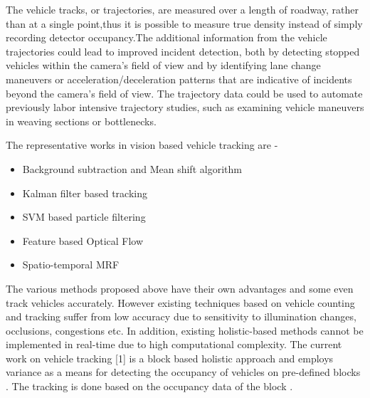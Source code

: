 \documentclass[a4paper,12pt]{article}
\begin{document}
\begin{flushleft}
\vspace{0.1in}
The vehicle tracks, or trajectories, are measured over a length of roadway, rather than at a single point,thus it is possible to measure true density instead of simply recording detector occupancy.The additional information from the vehicle trajectories could lead to improved incident
detection, both by detecting stopped vehicles within the camera's field of view and by identifying
lane change maneuvers or acceleration/deceleration patterns that are indicative of incidents beyond the camera's field of view. The trajectory data could be used to automate previously labor intensive trajectory studies, such as examining vehicle maneuvers in weaving sections or bottlenecks.
\end{flushleft}

\begin{flushleft}
\vspace{0.1in}
The representative works in vision based vehicle tracking are -
\end{flushleft}
\begin{itemize}
\setlength{\itemindent}{.2in}
\item Background subtraction and Mean shift algorithm 
\item Kalman filter based tracking
\item SVM based particle filtering
\item Feature based Optical Flow
\item Spatio-temporal MRF 
\end{itemize}

\vspace{0.1in}
\begin{flushleft}
The various methods proposed above have their own advantages and some even track vehicles accurately. However existing techniques based on vehicle counting and tracking suffer from low accuracy due to sensitivity to illumination changes, occlusions, congestions etc. In addition, existing holistic-based methods cannot be implemented in real-time due to high computational complexity. The current work on vehicle tracking [1] is a block based holistic approach and employs variance as a means for detecting the occupancy of vehicles on pre-defined blocks . The tracking is done based on the occupancy data of the block . 
\end{flushleft}

\newpage
\end{document}
